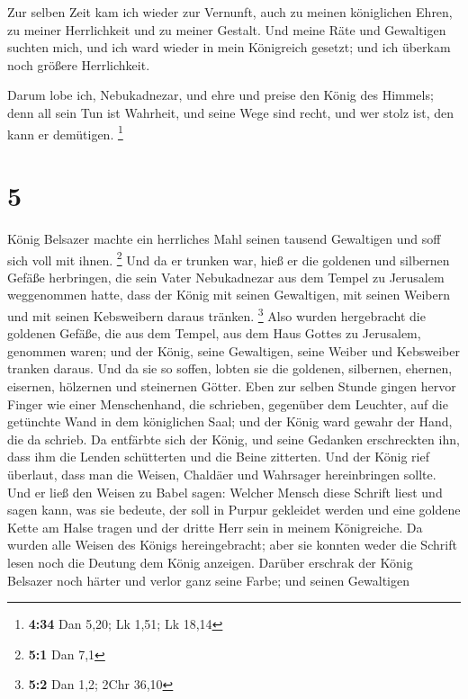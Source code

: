  Zur selben Zeit kam ich wieder zur Vernunft, auch zu
meinen königlichen Ehren, zu meiner Herrlichkeit und zu meiner Gestalt.
Und meine Räte und Gewaltigen suchten mich, und ich ward wieder in mein
Königreich gesetzt; und ich überkam noch größere Herrlichkeit.

 Darum lobe ich, Nebukadnezar, und ehre und preise den
König des Himmels; denn all sein Tun ist Wahrheit, und seine Wege sind
recht, und wer stolz ist, den kann er demütigen. \footnote{\textbf{4:34}
  Dan 5,20; Lk 1,51; Lk 18,14}

\hypertarget{section-4}{%
\section{5}\label{section-4}}

 König Belsazer machte ein herrliches Mahl seinen tausend
Gewaltigen und soff sich voll mit ihnen. \footnote{\textbf{5:1} Dan 7,1}
 Und da er trunken war, hieß er die goldenen und silbernen
Gefäße herbringen, die sein Vater Nebukadnezar aus dem Tempel zu
Jerusalem weggenommen hatte, dass der König mit seinen Gewaltigen, mit
seinen Weibern und mit seinen Kebsweibern daraus tränken. \footnote{\textbf{5:2}
  Dan 1,2; 2Chr 36,10}  Also wurden hergebracht die
goldenen Gefäße, die aus dem Tempel, aus dem Haus Gottes zu Jerusalem,
genommen waren; und der König, seine Gewaltigen, seine Weiber und
Kebsweiber tranken daraus.  Und da sie so soffen, lobten
sie die goldenen, silbernen, ehernen, eisernen, hölzernen und steinernen
Götter.  Eben zur selben Stunde gingen hervor Finger wie
einer Menschenhand, die schrieben, gegenüber dem Leuchter, auf die
getünchte Wand in dem königlichen Saal; und der König ward gewahr der
Hand, die da schrieb.  Da entfärbte sich der König, und
seine Gedanken erschreckten ihn, dass ihm die Lenden schütterten und die
Beine zitterten.  Und der König rief überlaut, dass man
die Weisen, Chaldäer und Wahrsager hereinbringen sollte. Und er ließ den
Weisen zu Babel sagen: Welcher Mensch diese Schrift liest und sagen
kann, was sie bedeute, der soll in Purpur gekleidet werden und eine
goldene Kette am Halse tragen und der dritte Herr sein in meinem
Königreiche.  Da wurden alle Weisen des Königs
hereingebracht; aber sie konnten weder die Schrift lesen noch die
Deutung dem König anzeigen.  Darüber erschrak der König
Belsazer noch härter und verlor ganz seine Farbe; und seinen Gewaltigen
